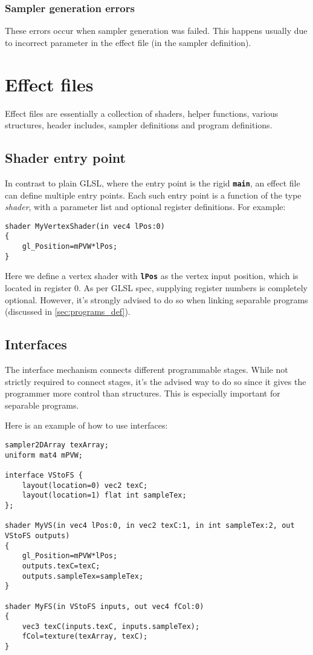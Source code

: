 \documentclass[11pt,a4paper,final,titlepage]{article}
\let\orgautoref\autoref
\renewcommand{\autoref}{%
\def\sectionautorefname{Sec.}%
\def\subsectionautorefname{Sec.}%
\def\algocflineautorefname{Alg.}%
\def\lemmaautorefname{Lemma}%
\orgautoref}
\begin{document}
\subsubsection{Sampler generation errors}
These errors occur when sampler generation was failed. This happens usually due to incorrect
parameter in the effect file (in the sampler definition).

\pagebreak
\section{Effect files}\label{sec:effFiles}
Effect files are essentially a collection of shaders, helper functions, various structures, header
includes, sampler definitions and program definitions.

\subsection{Shader entry point}
In contrast to plain GLSL, where the entry point is the rigid \texttt{\textbf{main}}, an effect
file can define multiple entry points. Each such entry point is a function of the type
\emph{shader}, with a parameter list and optional register definitions. For example:
\begin{lstlisting}
shader MyVertexShader(in vec4 lPos:0)
{
	gl_Position=mPVW*lPos;
}
\end{lstlisting}
Here we define a vertex shader with \texttt{\textbf{lPos}} as the vertex input position, which is located
in register $0$. As per GLSL spec, supplying register numbers is completely optional. However, it's
strongly advised to do so when linking separable programs (discussed in \autoref{sec:programs_def}).

\subsection{Interfaces}
The interface mechanism connects different programmable stages. While not
strictly required to connect stages, it's the advised way to do so since
it gives the programmer more control than structures. This is especially important for separable
programs.

Here is an example of how to use interfaces:
\begin{lstlisting}
sampler2DArray texArray;
uniform mat4 mPVW;

interface VStoFS {
	layout(location=0) vec2 texC;
	layout(location=1) flat int sampleTex;
};

shader MyVS(in vec4 lPos:0, in vec2 texC:1, in int sampleTex:2, out VStoFS outputs)
{
	gl_Position=mPVW*lPos;
	outputs.texC=texC;
	outputs.sampleTex=sampleTex;
}

shader MyFS(in VStoFS inputs, out vec4 fCol:0)
{
	vec3 texC(inputs.texC, inputs.sampleTex);
	fCol=texture(texArray, texC);
}
\end{lstlisting}
\end{document}
